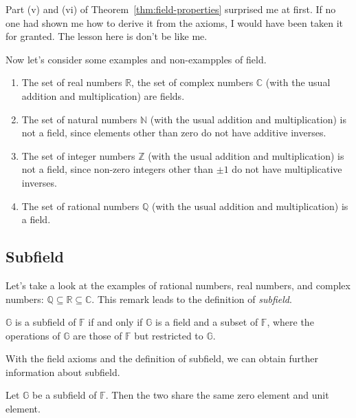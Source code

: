 \begin{note}
	Part (v) and (vi) of Theorem~\ref{thm:field-properties} surprised me at first. If no one had shown me how to derive it from the axioms, I would have been taken it for granted. The lesson here is don't be like me.
\end{note}

Now let's consider some examples and non-exampples of field.

\begin{example}
	\begin{enumerate}[label = (\alph*)]
		\item The set of real numbers $\mathbb{R}$, the set of complex numbers $\mathbb{C}$ (with the usual addition and multiplication) are fields.
		\item The set of natural numbers $\mathbb{N}$ (with the usual addition and multiplication) is not a field, since elements other than zero do not have additive inverses.
		\item The set of integer numbers $\mathbb{Z}$ (with the usual addition and multiplication) is not a field, since non-zero integers other than $\pm 1$ do not have multiplicative inverses.
		\item The set of rational numbers $\mathbb{Q}$ (with the usual addition and multiplication) is a field.
	\end{enumerate}
\end{example}

\subsection{Subfield}

Let's take a look at the examples of rational numbers, real numbers, and complex numbers: $\mathbb{Q}\subseteq\mathbb{R}\subseteq\mathbb{C}$. This remark leads to the definition of \textit{subfield}.

\begin{definition}[Subfield]
	$\mathbb{G}$ is a subfield of $\mathbb{F}$ if and only if $\mathbb{G}$ is a field and a subset of $\mathbb{F}$, where the operations of $\mathbb{G}$ are those of $\mathbb{F}$ but restricted to $\mathbb{G}$.
\end{definition}

With the field axioms and the definition of subfield, we can obtain further information about subfield.

\begin{theorem}
	Let $\mathbb{G}$ be a subfield of $\mathbb{F}$. Then the two share the same zero element and unit element.
\end{theorem}

